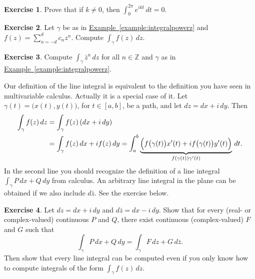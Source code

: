 \documentclass[12pt,openany]{book}
\newcommand{\Z}{{\mathbb{Z}}}
\theoremstyle{plain}
\theoremstyle{remark}
\theoremstyle{definition}
\newenvironment{exbox}{%
    \def\FrameCommand{\vrule width 1pt \relax\hspace{10pt}}%
    \MakeFramed{\advance\hsize-\width\FrameRestore}%
}{%
    \endMakeFramed
}
\theoremstyle{exercise}
\newtheorem{exercise}{Exercise}[section]
\theoremstyle{example}
\newcommand{\exampleref}[1]{\hyperref[#1]{Example~\ref*{#1}}}
\begin{document}
\begin{exbox}
\begin{exercise}
Prove that if $k\not= 0$, then $\int_0^{2\pi} e^{ik t} \, dt = 0$.
\end{exercise}

\begin{exercise}
Let $\gamma$ be as in \exampleref{example:integralpowerz}
and 
$f(z) = \sum_{n=-d}^d c_n z^n$.
Compute $\int_\gamma f(z) \, dz$.
\end{exercise}

\begin{exercise}
Compute $\int_\gamma \bar{z}^n \, dz$ for all $n \in \Z$ and $\gamma$ as in
\exampleref{example:integralpowerz}.
\end{exercise}
\end{exbox}

Our definition of the line integral is equivalent to the definition you
have seen in multivariable calculus.  Actually it is a special case of it.
Let $\gamma(t) = \bigl( x(t), y(t) \bigr)$, for $t \in [a,b]$, be a path,
and let $dz = dx + i\, dy$.
Then
\begin{equation*}
\begin{split}
\int_{\gamma} f(z) \, dz
& =
\int_{\gamma} f(z) \, (dx + i\, dy)
\\
& =
\int_{\gamma} f(z) \, dx + i f(z) \, dy
=
\int_a^b \underbrace{\Bigl( f\bigl(\gamma(t)\bigr) x'(t) + i f\bigl(\gamma(t)\bigr) y'(t) \Bigr)}_{f(\gamma(t)) \gamma'(t)} \, dt .
\end{split}
\end{equation*}
In the second line you should recognize the definition of a line integral
$\int_\gamma P\,dx + Q \, dy$ from calculus.  An arbitrary
line integral in the plane can be obtained if we also include $d\bar{z}$.  See the
exercise below.

\begin{exbox}
\begin{exercise} \label{exercise:realpathintegral}
%
Let $dz = dx + i \, dy$ and 
$d\bar{z} = dx - i \, dy$.  Show that for every (real- or complex-valued) continuous $P$ and $Q$,
there exist continuous (complex-valued) $F$ and $G$ such that
\begin{equation*}
\int_{\gamma} P \, dx + Q \, dy
=
\int_{\gamma} F \, dz + G \, d\bar{z} .
\end{equation*}
Then show that every line integral
can be computed even if you only know how to compute integrals of the form
$\int_\gamma f(z) \, dz$.
\end{exercise}
\end{exbox}
\end{document}
